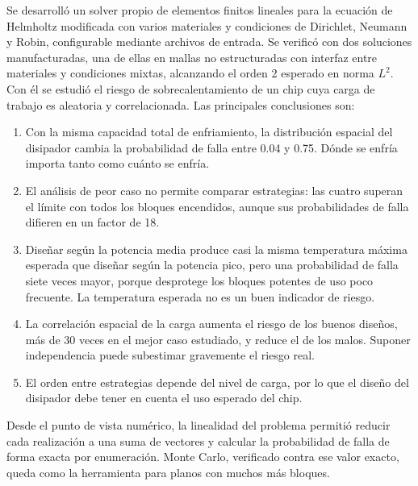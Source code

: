 \documentclass[preprint,11pt,sort&compress]{elsarticle}
\begin{document}
Se desarrolló un solver propio de elementos finitos lineales para la ecuación de
Helmholtz modificada con varios materiales y condiciones de Dirichlet, Neumann y Robin,
configurable mediante archivos de entrada. Se verificó con dos soluciones manufacturadas,
una de ellas en mallas no estructuradas con interfaz entre materiales y condiciones
mixtas, alcanzando el orden 2 esperado en norma $L^2$. Con él se estudió el riesgo de
sobrecalentamiento de un chip cuya carga de trabajo es aleatoria y correlacionada. Las
principales conclusiones son:
\begin{enumerate}
\item Con la misma capacidad total de enfriamiento, la distribución espacial del
  disipador cambia la probabilidad de falla entre \num{0.04} y \num{0.75}. Dónde se enfría
  importa tanto como cuánto se enfría.
\item El análisis de peor caso no permite comparar estrategias: las cuatro superan el
  límite con todos los bloques encendidos, aunque sus probabilidades de falla difieren en un
  factor de 18.
\item Diseñar según la potencia media produce casi la misma temperatura máxima esperada
  que diseñar según la potencia pico, pero una probabilidad de falla siete veces mayor,
  porque desprotege los bloques potentes de uso poco frecuente. La temperatura esperada no
  es un buen indicador de riesgo.
\item La correlación espacial de la carga aumenta el riesgo de los buenos diseños, más de
  30 veces en el mejor caso estudiado, y reduce el de los malos. Suponer independencia
  puede subestimar gravemente el riesgo real.
\item El orden entre estrategias depende del nivel de carga, por lo que el diseño del
  disipador debe tener en cuenta el uso esperado del chip.
\end{enumerate}
Desde el punto de vista numérico, la linealidad del problema permitió reducir cada
realización a una suma de vectores y calcular la probabilidad de falla de forma exacta por
enumeración. Monte Carlo, verificado contra ese valor exacto, queda como la herramienta
para planos con muchos más bloques.
\end{document}
